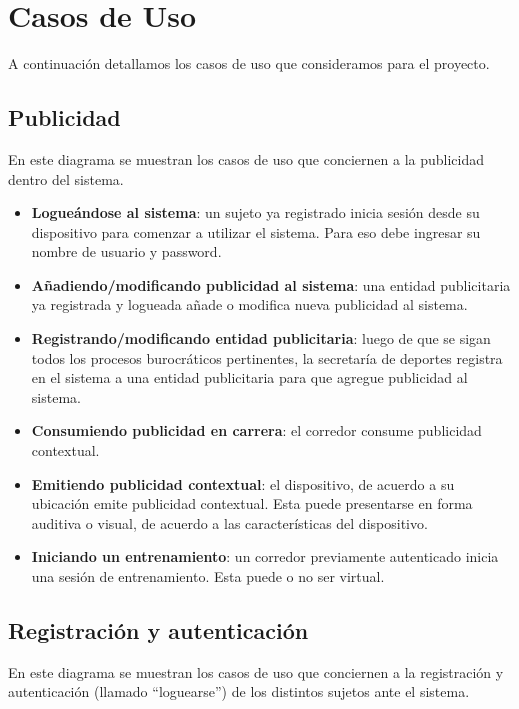 \section{Casos de Uso}

A continuación detallamos los casos de uso que consideramos para el proyecto.

\subsection{Publicidad}
En este diagrama se muestran los casos de uso que conciernen a la publicidad dentro del sistema.

\begin{itemize}
	\item \textbf{Logueándose al sistema}: un sujeto ya registrado inicia sesión desde su dispositivo para comenzar a utilizar el sistema. Para eso debe ingresar su nombre de usuario y password.
	\item \textbf{Añadiendo/modificando publicidad al sistema}: una entidad publicitaria ya registrada y logueada añade o modifica nueva publicidad al sistema.
	\item \textbf{Registrando/modificando entidad publicitaria}: luego de que se sigan todos los procesos burocráticos pertinentes, la secretaría de deportes registra en el sistema a una entidad publicitaria para que agregue publicidad al sistema.
	\item \textbf{Consumiendo publicidad en carrera}: el corredor consume publicidad contextual.
	\item \textbf{Emitiendo publicidad contextual}: el dispositivo, de acuerdo a su ubicación emite publicidad contextual. Esta puede presentarse en forma auditiva o visual, de acuerdo a las características del dispositivo.
	\item \textbf{Iniciando un entrenamiento}: un corredor previamente autenticado inicia una sesión de entrenamiento. Esta puede o no ser virtual.
\end{itemize}

\subsection{Registración y autenticación}
En este diagrama se muestran los casos de uso que conciernen a la registración y autenticación (llamado ``loguearse'') de los distintos sujetos ante el sistema. 

